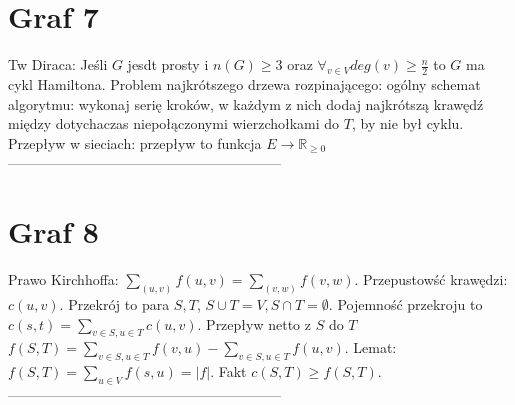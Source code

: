 \documentclass{article}
\begin{document}
\begin{minipage}[t]{.33\textwidth}
\section*{Graf 7}
Tw Diraca: Jeśli $G$ jesdt prosty i $n(G) \geq 3$ oraz  $\forall_{v\in V} deg(v) \geq \frac{n}{2}$ to $G$ ma cykl Hamiltona. Problem najkrótszego drzewa rozpinającego: ogólny schemat algorytmu: wykonaj serię kroków, w każdym z nich dodaj najkrótszą krawędź między dotychaczas niepołączonymi wierzchołkami do $T$, by nie był cyklu. Przepływ w sieciach: przepływ to funkcja $E \rightarrow \mathbb{R}_{\geq 0}$
\\-----------------------------------------------------------
\section*{Graf 8}
Prawo Kirchhoffa: $\sum_{(u,v)} f(u,v) = \sum_{(v,w)}f(v,w)$.
Przepustowść krawędzi: $c(u,v)$. 
Przekrój to para $S,T$, $S \cup T = V, S\cap T = \emptyset $. Pojemność przekroju to $c(s,t) = \sum_{v\in S,u \in T}c(u,v)$. Przepływ netto z $S$ do $T$ $f(S,T) = \sum_{v\in S, u \in T}f(v,u) - \sum_{v\in S, u \in T}f(u,v)$. Lemat: $f(S,T) = \sum_{u\in V} f(s,u) = |f|$. Fakt $c(S,T) \geq f(S,T)$.
\\-----------------------------------------------------------
\end{minipage}
\newpage
\end{document}
